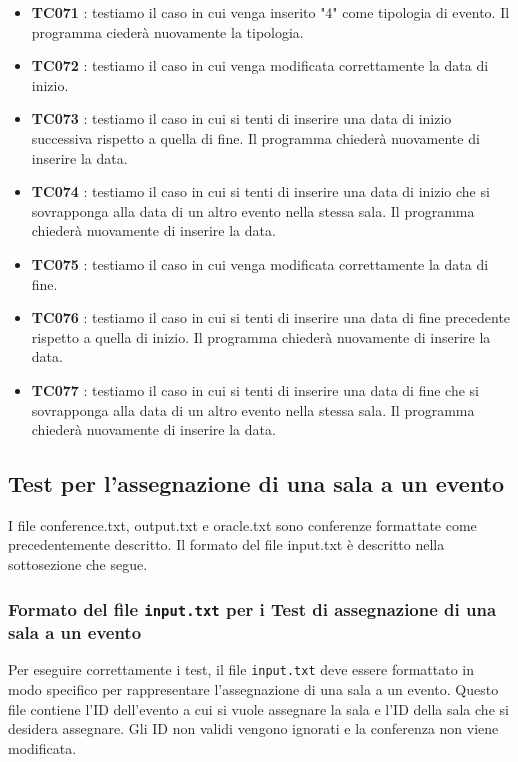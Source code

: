 \documentclass[11pt]{scrartcl} %
\begin{document}
\begin{itemize}
	\item \textbf{TC071} : testiamo il caso in cui venga inserito "4"  come tipologia di evento. Il programma ciederà nuovamente la tipologia.

	\item \textbf{TC072} : testiamo il caso in cui venga modificata correttamente la data di inizio.

	\item \textbf{TC073} : testiamo il caso in cui si tenti di inserire una data di inizio successiva rispetto a quella di fine. Il programma chiederà nuovamente di inserire la data.

	\item \textbf{TC074} : testiamo il caso in cui si tenti di inserire una data di inizio che si sovrapponga alla data di un altro evento nella stessa sala. Il programma chiederà nuovamente di inserire la data.

	\item \textbf{TC075} : testiamo il caso in cui venga modificata correttamente la data di fine.

	\item \textbf{TC076} : testiamo il caso in cui si tenti di inserire una data di fine precedente rispetto a quella di inizio. Il programma chiederà nuovamente di inserire la data.

	\item \textbf{TC077} : testiamo il caso in cui si tenti di inserire una data di fine che si sovrapponga alla data di un altro evento nella stessa sala. Il programma chiederà nuovamente di inserire la data.


\end{itemize}

\subsection{Test per l'assegnazione di una sala a un evento}

I file conference.txt, output.txt e oracle.txt sono conferenze formattate come precedentemente descritto. Il formato del file input.txt è descritto nella sottosezione che segue.

\subsubsection{Formato del file \texttt{input.txt} per i Test di  assegnazione di una sala a un evento}

Per eseguire correttamente i test, il file \texttt{input.txt} deve essere formattato in modo specifico per rappresentare l'assegnazione di una sala a un evento. Questo file contiene l'ID dell'evento a cui si vuole assegnare la sala e l'ID della sala che si desidera assegnare.
Gli ID non validi vengono ignorati e la conferenza non viene modificata.
\end{document}
